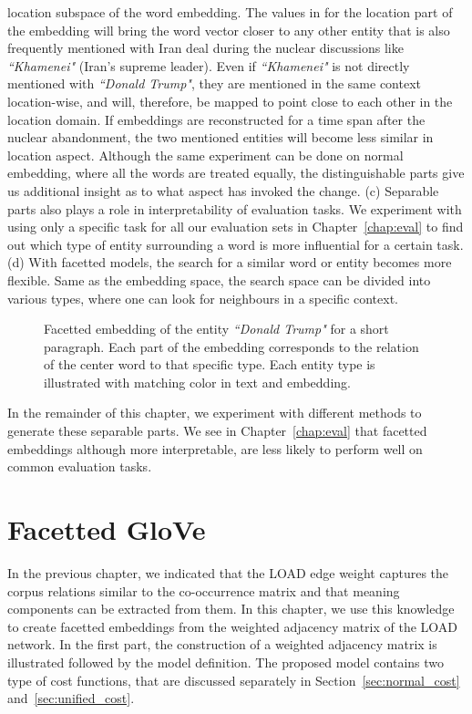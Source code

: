location subspace of the word embedding. The values in for the location part of the embedding will bring the word vector closer to any other entity that is also frequently mentioned with Iran deal during the nuclear discussions like \emph{``Khamenei"} (Iran's supreme leader). Even if \emph{``Khamenei"} is not directly mentioned with \emph{``Donald Trump"}, they are mentioned in the same context location-wise, and will, therefore, be mapped to point close to each other in the location domain. If embeddings are reconstructed for a time span after the nuclear abandonment, the two mentioned entities will become less similar in location aspect. Although the same experiment can be done on normal embedding, where all the words are treated equally, the distinguishable parts give us additional insight as to what aspect has invoked the change. (c) Separable parts also plays a role in interpretability of evaluation tasks. We experiment with using only a specific task for all our evaluation sets in Chapter~\ref{chap:eval} to find out which type of entity surrounding a word is more influential for a certain task. (d) With facetted models, the search for a similar word or entity becomes more flexible. Same as the embedding space, the search space can be divided into various types, where one can look for neighbours in a specific context. \\
\begin{figure}
\centering 
\resizebox{0.97\textwidth}{0.3\textwidth}{      

}
\caption{Facetted embedding of  the entity \emph{``Donald Trump"} for a short paragraph. Each part of the embedding corresponds to the relation of the center word to that specific type. Each entity type is illustrated with matching color in text and embedding. }
\label{fig:facetted_emb}
\end{figure} 
In the remainder of this chapter, we experiment with different methods to generate these separable parts. We see in Chapter~\ref{chap:eval} that facetted embeddings although more interpretable, are less likely to perform well on common evaluation tasks. 
\section{Facetted GloVe }\label{sec:facetted_glove}
In the previous chapter, we indicated that the LOAD edge weight captures the corpus relations similar to the co-occurrence matrix and that meaning components can be extracted from them. In this chapter, we use this knowledge to create facetted embeddings from the weighted adjacency matrix of the LOAD network. In the first part, the construction of a weighted adjacency matrix is illustrated followed by the model definition. The proposed model contains two type of cost functions, that are discussed separately in Section~\ref{sec:normal_cost} and~\ref{sec:unified_cost}. 
